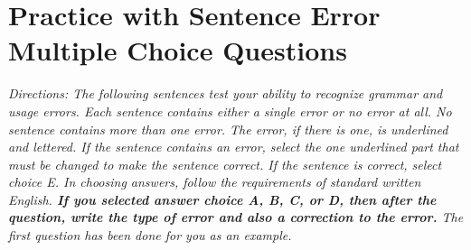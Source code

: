 \documentclass[12pt]{book}
\begin{document}
\section[Sentence Error]{Practice with Sentence Error Multiple Choice Questions}
\textit{Directions: The following sentences test your ability to recognize grammar and usage errors. Each sentence contains either a single error or no error at all. No sentence contains more than one error. The error, if there is one, is underlined and lettered. If the sentence contains an error, select the one underlined part that must be changed to make the sentence correct. If the sentence is correct, select choice E. In choosing answers, follow the requirements of standard written English. \textbf{If you selected answer choice A, B, C, or D, then after the question, write the type of error and also a correction to the error.} The first question has been done for you as an example.}
\end{document}
